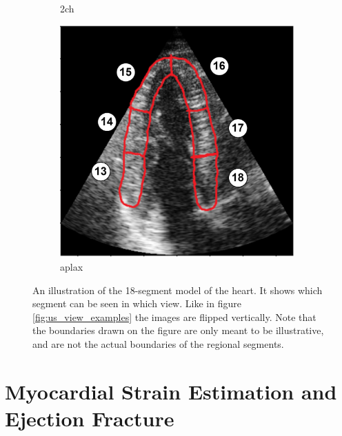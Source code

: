 \begin{figure}[H]
\begin{subfigure}[b]{0.3\textwidth}
        \caption{\acrshort{2ch}}
        \label{fig:18_segment_model_2ch}
    \end{subfigure}
    \begin{subfigure}[b]{0.3\textwidth}
        \includegraphics[width=0.99\textwidth]{echocardiography/aplax_frame_segmented.png}
        \caption{\acrshort{aplax}}
        \label{fig:18_segment_model_aplax}
    \end{subfigure}
    \caption{An illustration of the 18-segment model of the heart. It shows which segment can be seen in which view. Like in figure \ref{fig:us_view_examples} the images are flipped vertically. Note that the boundaries drawn on the figure are only meant to be illustrative, and are not the actual boundaries of the regional segments.}
    \label{fig:18_segment_model}
\end{figure}

\section{Myocardial Strain Estimation and Ejection Fracture}

